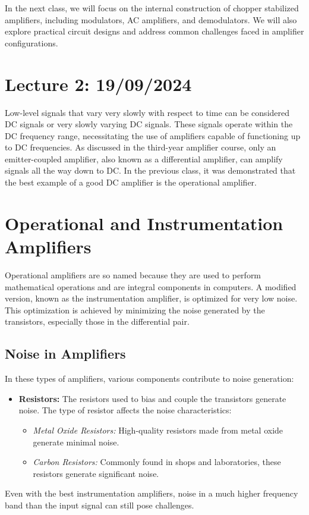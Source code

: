 In the next class, we will focus on the internal construction of chopper stabilized amplifiers, including modulators, AC amplifiers, and demodulators. We will also explore practical circuit designs and address common challenges faced in amplifier configurations.

\newpage

\section{Lecture 2: 19/09/2024}
Low-level signals that vary very slowly with respect to time can be considered DC signals or very slowly varying DC signals. These signals operate within the DC frequency range, necessitating the use of amplifiers capable of functioning up to DC frequencies. As discussed in the third-year amplifier course, only an emitter-coupled amplifier, also known as a differential amplifier, can amplify signals all the way down to DC. In the previous class, it was demonstrated that the best example of a good DC amplifier is the operational amplifier.

\section{Operational and Instrumentation Amplifiers}
Operational amplifiers are so named because they are used to perform mathematical operations and are integral components in computers. A modified version, known as the instrumentation amplifier, is optimized for very low noise. This optimization is achieved by minimizing the noise generated by the transistors, especially those in the differential pair.

\subsection{Noise in Amplifiers}
In these types of amplifiers, various components contribute to noise generation:
\begin{itemize}
    \item \textbf{Resistors:} The resistors used to bias and couple the transistors generate noise. The type of resistor affects the noise characteristics:
    \begin{itemize}
        \item \textit{Metal Oxide Resistors:} High-quality resistors made from metal oxide generate minimal noise.
        \item \textit{Carbon Resistors:} Commonly found in shops and laboratories, these resistors generate significant noise.
    \end{itemize}
\end{itemize}
Even with the best instrumentation amplifiers, noise in a much higher frequency band than the input signal can still pose challenges.

